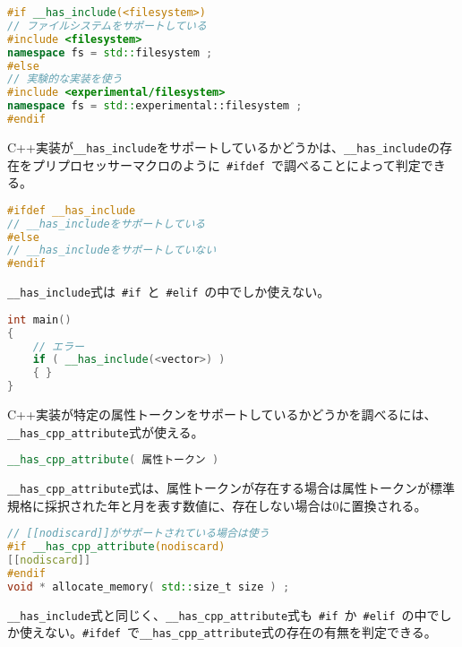 \begin{lstlisting}[language=C++]
#if __has_include(<filesystem>) 
// ファイルシステムをサポートしている
#include <filesystem>
namespace fs = std::filesystem ;
#else
// 実験的な実装を使う
#include <experimental/filesystem>
namespace fs = std::experimental::filesystem ;
#endif
\end{lstlisting}

C++実装が\lstinline!__has_include!をサポートしているかどうかは、\lstinline!__has_include!の存在をプリプロセッサーマクロのように~\lstinline!#ifdef!~で調べることによって判定できる。

\begin{lstlisting}[language=C++]
#ifdef __has_include
// __has_includeをサポートしている
#else
// __has_includeをサポートしていない
#endif
\end{lstlisting}

\lstinline!__has_include!式は~\lstinline!#if!~と~\lstinline!#elif!~の中でしか使えない。

\begin{lstlisting}[language=C++]
int main()
{
    // エラー
    if ( __has_include(<vector>) )
    { }
}
\end{lstlisting}

%

C++実装が特定の属性トークンをサポートしているかどうかを調べるには、\lstinline!__has_cpp_attribute!式が使える。

\begin{lstlisting}[language=C++]
__has_cpp_attribute( 属性トークン )
\end{lstlisting}

\lstinline!__has_cpp_attribute!式は、属性トークンが存在する場合は属性トークンが標準規格に採択された年と月を表す数値に、存在しない場合は0に置換される。

\begin{lstlisting}[language=C++]
// [[nodiscard]]がサポートされている場合は使う
#if __has_cpp_attribute(nodiscard)
[[nodiscard]]
#endif
void * allocate_memory( std::size_t size ) ;
\end{lstlisting}

\lstinline!__has_include!式と同じく、\lstinline!__has_cpp_attribute!式も~\lstinline!#if!~か~\lstinline!#elif!~の中でしか使えない。\lstinline!#ifdef!~で\lstinline!__has_cpp_attribute!式の存在の有無を判定できる。
